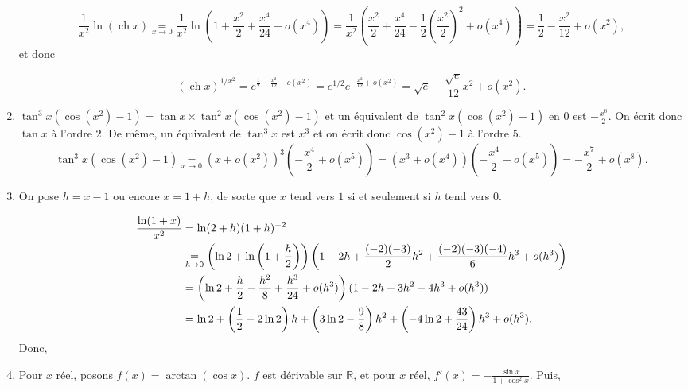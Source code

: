 \documentclass[11pt,a4paper]{article}
\newcommand{\Rr}{\mathbb{R}} \newcommand{\R}{\mathbb{R}}
\newcommand{\ch}{\mathop{\mathrm{ch}}\nolimits}
\newcommand{\Arctan}{\mathop{\mathrm{arctan}}\nolimits}
\begin{document}
\begin{enumerate}
$$\frac{1}{x^2}\ln(\ch x)\underset{x\rightarrow0}{=}\frac{1}{x^2}\ln\left(1+\frac{x^2}{2}+\frac{x^4}{24}+o(x^4)\right)=\frac{1}{x^2}\left(\frac{x^2}{2}+\frac{x^4}{24}-\frac{1}{2}\left(\frac{x^2}{2}\right)^2+o(x^4)\right)=\frac{1}{2}-\frac{x^2}{12}+o(x^2),$$
et donc 

$$(\ch x)^{1/x^2}=e^{\frac{1}{2}-\frac{x^2}{12}+o(x^2)}=e^{1/2}e^{-\frac{x^2}{12}+o(x^2)}=\sqrt{e}-\frac{\sqrt{e}}{12}x^2+o(x^2).$$

\begin{center}
\shadowbox{$(\ch x)^{1/x^2}=\underset{x\rightarrow0}=\sqrt{e}-\frac{\sqrt{e}}{12}x^2+o(x^2).$
}
\end{center}
 \item  $\tan^3x(\cos(x^2)-1)=\tan x\times\tan^2x(\cos(x^2)-1)$ et un équivalent de $\tan^2x(\cos(x^2)-1)$ en $0$ est $-\frac{x^6}{2}$. On écrit donc $\tan x$ à l'ordre $2$. De même, un équivalent de $\tan^3x$ est $x^3$ et on écrit donc $\cos(x^2)-1$ à l'ordre $5$.
$$\tan^3x(\cos(x^2)-1)\underset{x\rightarrow0}{=}(x+o(x^2))^3\left(-\frac{x^4}{2}+o(x^5)\right)=(x^3+o(x^4))\left(-\frac{x^4}{2}
+o(x^5)\right)=-\frac{x^7}{2}+o(x^8).$$

\begin{center}
\end{center}

 \item  On pose $h=x-1$ ou encore $x=1+h$, de sorte que $x$ tend vers $1$ si et seulement si $h$ tend vers $0$.

\begin{align*}\ensuremath
\frac{\ln(1+x)}{x^2}&=\ln(2+h)(1+h)^{-2}\\
 &\underset{h\rightarrow0}{=}\left(\ln2+\ln\left(1+\frac{h}{2}\right)\right)\left(1-2h+\frac{(-2)(-3)}{2}h^2+\frac{(-2)(-3)(-4)}{6}h^3
 +o(h^3)\right)\\
  &=\left(\ln2+\frac{h}{2}-\frac{h^2}{8}+\frac{h^3}{24}+o(h^3)\right)(1-2h+3h^2-4h^3+o(h^3))\\
  &=\ln2+\left(\frac{1}{2}-2\ln2\right)h+\left(3\ln2-\frac{9}{8}\right)h^2+\left(-4\ln2+\frac{43}{24}\right)h^3 + o(h^3).
\end{align*}
Donc,

\begin{center}
\end{center}
 \item  Pour $x$ réel, posons $f(x)=\Arctan(\cos x)$.
$f$ est dérivable sur $\Rr$, et pour $x$ réel, $f'(x)=-\frac{\sin x}{1+\cos^2x}$. Puis,


\end{enumerate}
\end{document}
